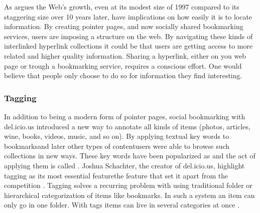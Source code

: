 
As \citet[]{dieberger97} argues the Web's growth, even at its modest
size of 1997 compared to its staggering size over 10 years later, have
implications on how easily it is to locate information. By creating pointer
pages, and now socially shared bookmarking services, users are imposing a
structure on the web. By navigating these kinds of interlinked hyperlink
collections it could be that users are getting access to more related and
higher quality information. Sharing a hyperlink, either on you web page or
trough a bookmarking service, requires a conscious effort. One would believe
that people only choose to do so for information they find interesting.

\subsubsection{Tagging}

In addition to being a modern form of pointer pages, social bookmarking
with del.icio.us introduced a new way to annotate all kinds of
items (photos, articles, wine, books, videos, music, and so on).
By applying textual key words to
bookmarks\dash{}and later other types of content\dash{}users were able to
browse such collections in new ways. These key words have been popularized as
 and the act of applying them is called %
.
Joshua Schachter, the creator of del.icio.us, highlight tagging as its most
essential feature\dash{}the feature that set it apart from the competition
\cite[]{livingston07}. Tagging solves a recurring problem with
using traditional folder or hierarchical categorization of items like
bookmarks. In such a system an item can only go in one folder. With
tags items can live in several categories at once
\citep[]{weinberger07}.

